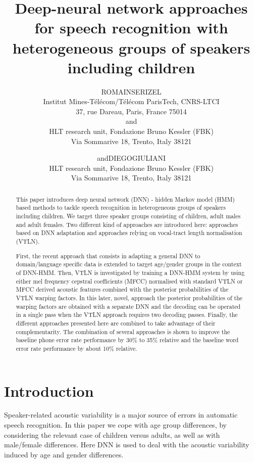 \documentclass{nle}
\title[DNN approaches for ASR with heterogeneous groups of speakers]{Deep-neural network approaches for speech recognition with heterogeneous groups of speakers including children}
\author[Romain Serizel and Diego Giuliani]{R\ls O\ls M\ls A\ls I\ls N\ns S\ls E\ls R\ls I\ls Z\ls E\ls L\\
Institut Mines-Télécom/Télécom ParisTech, CNRS-LTCI\\
37, rue Dareau, Paris, France 75014\\
and \\
HLT research unit, Fondazione Bruno Kessler (FBK)\\
Via Sommarive 18, Trento, Italy 38121
\and
and\ns D\ls I\ls E\ls G\ls O\ns G\ls I\ls U\ls L\ls I\ls A\ls N\ls I\\
HLT research unit, Fondazione Bruno Kessler (FBK)\\
Via Sommarive 18, Trento, Italy 38121}
\begin{document}
\label{firstpage}
\maketitle
\begin{abstract} %
This paper introduces deep neural network  (DNN) -  hidden  Markov model (HMM) based methods to tackle speech recognition in heterogeneous groups of speakers including children. We target three speaker groups consisting of children, adult males and adult females. Two different kind of approaches are introduced here: approaches based on DNN adaptation and approaches relying on vocal-tract length normalisation (VTLN).

First, the recent approach that consists
in adapting a general DNN to domain/language specific data is extended
to target  age/gender groups  in the context  of DNN-HMM. Then, VTLN is investigated by training a DNN-HMM system by using either mel frequency cepstral coefficients (MFCC) normalised with standard VTLN or MFCC derived acoustic features combined with the posterior probabilities of the VTLN warping factors. In this later, novel, approach the posterior probabilities of the warping factors are obtained with a separate DNN and the decoding can be operated in a single pass when the VTLN approach requires two decoding passes. Finally, the different approaches presented here are combined to take advantage of their complementarity. The combination of several approaches is shown to improve the baseline phone error rate performance by 30\% to 35\% relative and the baseline word error rate performance by about 10\% relative. 

\end{abstract}

\section{Introduction}
Speaker-related  acoustic variability is a major  source of
errors in automatic  speech recognition.  In this  paper we cope
with  age  group differences,  by  considering  the  relevant case  of
children versus adults, as well as with male/female differences. 
Here DNN is used to deal with the acoustic variability induced by  age and gender differences.
\end{document}
